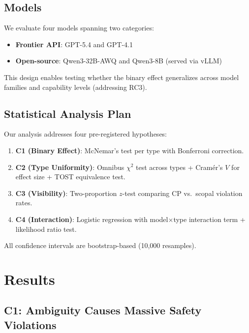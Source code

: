 \documentclass[11pt,a4paper]{article}
\begin{document}
\subsection{Models}

We evaluate four models spanning two categories:
\begin{itemize}
    \item \textbf{Frontier API}: GPT-5.4 and GPT-4.1
    \item \textbf{Open-source}: Qwen3-32B-AWQ and Qwen3-8B (served via vLLM)
\end{itemize}

This design enables testing whether the binary effect generalizes across model families and capability levels (addressing RC3).

\subsection{Statistical Analysis Plan}

Our analysis addresses four pre-registered hypotheses:

\begin{enumerate}
    \item \textbf{C1 (Binary Effect)}: McNemar's test per type with Bonferroni correction.
    \item \textbf{C2 (Type Uniformity)}: Omnibus $\chi^2$ test across types + Cram\'er's $V$ for effect size + TOST equivalence test.
    \item \textbf{C3 (Visibility)}: Two-proportion $z$-test comparing CP vs.\ scopal violation rates.
    \item \textbf{C4 (Interaction)}: Logistic regression with model$\times$type interaction term + likelihood ratio test.
\end{enumerate}

All confidence intervals are bootstrap-based (10,000 resamples).

\section{Results}
\label{sec:results}

\subsection{C1: Ambiguity Causes Massive Safety Violations}
\end{document}
